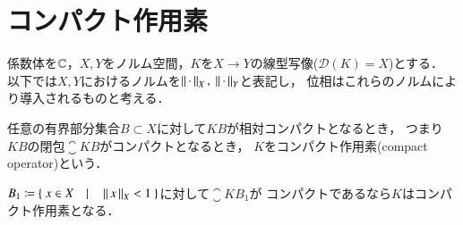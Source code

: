 \section{コンパクト作用素}
	係数体を$\mathbb{C}$，$X,Y$をノルム空間，$K$を$X \rightarrow Y$の線型写像($\mathscr{D}(K) = X$)とする．
	以下では$X,Y$におけるノルムを$\left\|\, \cdot\, \right\|_{X},\ \left\|\, \cdot\, \right\|_{Y}$と表記し，
	位相はこれらのノルムにより導入されるものと考える．
	
	\begin{itembox}[l]{}
		\begin{dfn}[コンパクト作用素]
			任意の有界部分集合$B \subset X$に対して$KB$が相対コンパクトとなるとき，
			つまり$KB$の閉包$\closure{KB}$がコンパクトとなるとき，
			$K$をコンパクト作用素(compact operator)という．
		\end{dfn}
	\end{itembox}
	
	\begin{itembox}[l]{}
		\begin{lem}[コンパクト作用素となるための十分条件の一つ]
			$B_1 \coloneqq \left\{\ x \in X\quad |\quad \Norm{x}{X} < 1\ \right\}$に対して$\closure{KB_1}$が
			コンパクトであるなら$K$はコンパクト作用素となる．
		\end{lem}
	\end{itembox}
	
